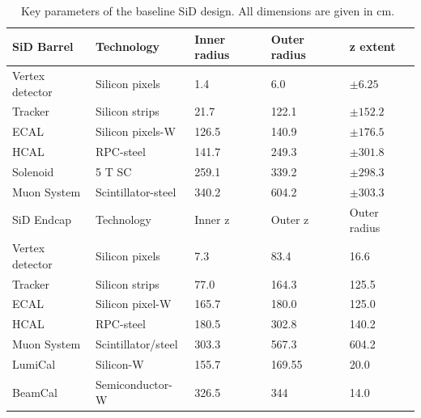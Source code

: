 \begin{table}
\caption[Key parameters of the baseline SiD design]{Key parameters of the baseline SiD design. All dimensions are given in cm.~\cite{SiDBkgNote}}
\label{tab:KeyParametersSiD}
\centering
\begin{tabularx}{0.81\textwidth}{l|llll}
\hline\hline
SiD Barrel & Technology & Inner radius & Outer radius & z extent\\
\hline
Vertex detector & Silicon pixels & 1.4 & 6.0 & $\pm 6.25$ \\
Tracker & Silicon strips & 21.7 & 122.1 & $\pm 152.2$ \\
ECAL & Silicon pixels-W & 126.5 & 140.9 & $\pm 176.5$ \\
HCAL & RPC-steel & 141.7 & 249.3 & $\pm 301.8$ \\
Solenoid & 5 T SC & 259.1 & 339.2 & $\pm 298.3$ \\
Muon System & Scintillator-steel & 340.2 & 604.2 & $\pm 303.3$ \\
\hline
SiD Endcap & Technology & Inner z & Outer z & Outer radius\\
\hline
Vertex detector & Silicon pixels & 7.3 & 83.4 & 16.6 \\
Tracker & Silicon strips & 77.0 & 164.3 & 125.5 \\
ECAL & Silicon pixel-W & 165.7 & 180.0 & 125.0 \\
HCAL & RPC-steel & 180.5 & 302.8 & 140.2 \\
Muon System & Scintillator/steel & 303.3 & 567.3 & 604.2 \\
LumiCal & Silicon-W & 155.7 & 169.55 &  20.0 \\
BeamCal & Semiconductor-W & 326.5 & 344 & 14.0 \\
\hline\hline
\end{tabularx}
\end{table}
